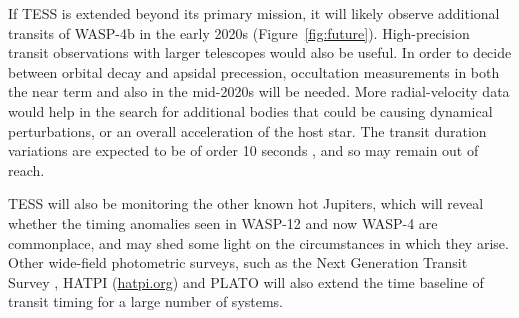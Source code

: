 \documentclass[12pt,twocolumn,tighten]{aastex62}
\begin{document}
{If TESS is extended beyond its primary mission, it will likely observe
additional transits of WASP-4b in the early 2020s
(Figure~\ref{fig:future}).  High-precision transit observations with
larger telescopes would also be useful.  In order to decide between
orbital decay and apsidal precession, occultation measurements in both
the near term and also in the mid-2020s will be needed.  More
radial-velocity data would help in the search for additional bodies
that could be causing dynamical perturbations, or an overall
acceleration of the host star.  The transit duration variations are
expected to be of order 10 seconds \citep{pal_periastron_2008}, and so
may remain out of reach.

TESS will also be monitoring the other known hot Jupiters, which will
reveal whether the timing anomalies seen in WASP-12 and now WASP-4 are
commonplace, and may shed some light on the circumstances in which
they arise. Other wide-field photometric surveys, such as the Next
Generation Transit Survey \citep{wheatley_next_2018}, HATPI
(\href{https://hatpi.org}{hatpi.org}) and PLATO
\citep{rauer_plato_2014} will also extend the time baseline of transit
timing for a large number of systems.

}
\end{document}

